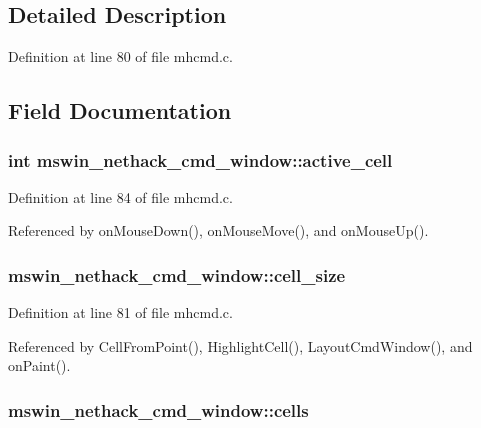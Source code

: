 \subsection{Detailed Description}


Definition at line 80 of file mhcmd.\+c.



\subsection{Field Documentation}
\hypertarget{structmswin__nethack__cmd__window_a2ef0bcb1c4f8861efd01cf5dd57eb421}{
\subsubsection[{active\+\_\+cell}]{\setlength{\rightskip}{0pt plus 5cm}int mswin\+\_\+nethack\+\_\+cmd\+\_\+window\+::active\+\_\+cell}}\label{structmswin__nethack__cmd__window_a2ef0bcb1c4f8861efd01cf5dd57eb421}


Definition at line 84 of file mhcmd.\+c.



Referenced by on\+Mouse\+Down(), on\+Mouse\+Move(), and on\+Mouse\+Up().

\hypertarget{structmswin__nethack__cmd__window_aaf1f18d57dc3cf2e745df8fa84bbacc6}{
\subsubsection[{cell\+\_\+size}]{ mswin\+\_\+nethack\+\_\+cmd\+\_\+window\+::cell\+\_\+size}}\label{structmswin__nethack__cmd__window_aaf1f18d57dc3cf2e745df8fa84bbacc6}


Definition at line 81 of file mhcmd.\+c.



Referenced by Cell\+From\+Point(), Highlight\+Cell(), Layout\+Cmd\+Window(), and on\+Paint().

\hypertarget{structmswin__nethack__cmd__window_a3ed8b7eff746d3659dea5e100607bda4}{
\subsubsection[{cells}]{ mswin\+\_\+nethack\+\_\+cmd\+\_\+window\+::cells}}\label{structmswin__nethack__cmd__window_a3ed8b7eff746d3659dea5e100607bda4}


